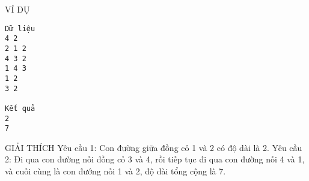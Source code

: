 VÍ DỤ
\begin{verbatim}
Dữ liệu
4 2
2 1 2
4 3 2
1 4 3
1 2
3 2

Kết quả
2
7
\end{verbatim}
GIẢI THÍCH
Yêu cầu 1: Con đường giữa đồng cỏ 1 và 2 có độ dài là 2. Yêu cầu 2: Đi qua con đường nối đồng cỏ 3 và 4, rồi tiếp tục đi qua con đường nối 4 và 1, và cuối cùng là con đướng nối 1 và 2, độ dài tổng cộng là 7.